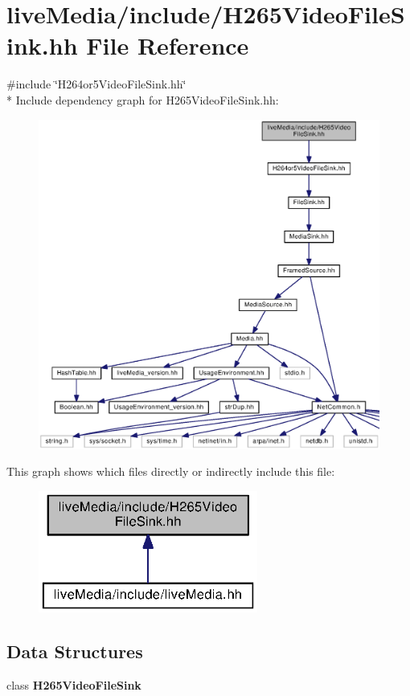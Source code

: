 \section{live\+Media/include/\+H265\+Video\+File\+Sink.hh File Reference}
\label{H265VideoFileSink_8hh}
{\ttfamily \#include \char`\"{}H264or5\+Video\+File\+Sink.\+hh\char`\"{}}\\*
Include dependency graph for H265\+Video\+File\+Sink.\+hh\+:
\nopagebreak
\begin{figure}[H]
\begin{center}
\leavevmode
\includegraphics[width=350pt]{H265VideoFileSink_8hh__incl}
\end{center}
\end{figure}
This graph shows which files directly or indirectly include this file\+:
\nopagebreak
\begin{figure}[H]
\begin{center}
\leavevmode
\includegraphics[width=204pt]{H265VideoFileSink_8hh__dep__incl}
\end{center}
\end{figure}
\subsection*{Data Structures}
\begin{DoxyCompactItemize}
\item 
class {\bf H265\+Video\+File\+Sink}
\end{DoxyCompactItemize}
